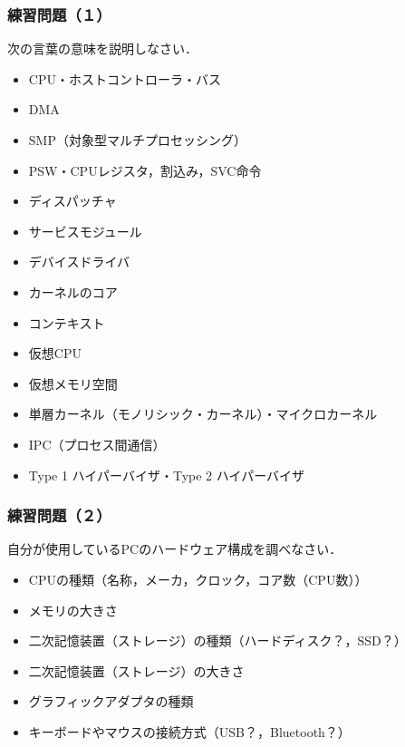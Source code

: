 \documentclass[unicode]{beamer}                   %
\begin{document}
\begin{frame}
  \frametitle{練習問題（１）}
  次の言葉の意味を説明しなさい．
  \begin{itemize}
  \item CPU・ホストコントローラ・バス
  \item DMA
  \item SMP（対象型マルチプロセッシング）
  \item PSW・CPUレジスタ，割込み，SVC命令
  \item ディスパッチャ
  \item サービスモジュール
  \item デバイスドライバ
  \item カーネルのコア
  \item コンテキスト
  \item 仮想CPU
  \item 仮想メモリ空間
  \item 単層カーネル（モノリシック・カーネル）・マイクロカーネル
  \item IPC（プロセス間通信）
  \item Type 1 ハイパーバイザ・Type 2 ハイパーバイザ
  \end{itemize}
  \vfill
\end{frame}

\begin{frame}
  \frametitle{練習問題（２）}
  自分が使用しているPCのハードウェア構成を調べなさい．
  \begin{itemize}
  \item CPUの種類（名称，メーカ，クロック，コア数（CPU数））
  \item メモリの大きさ
  \item 二次記憶装置（ストレージ）の種類（ハードディスク？，SSD？）
  \item 二次記憶装置（ストレージ）の大きさ
  \item グラフィックアダプタの種類
  \item キーボードやマウスの接続方式（USB？，Bluetooth？）
  \end{itemize}
  \vfill
\end{frame}
\end{document}
